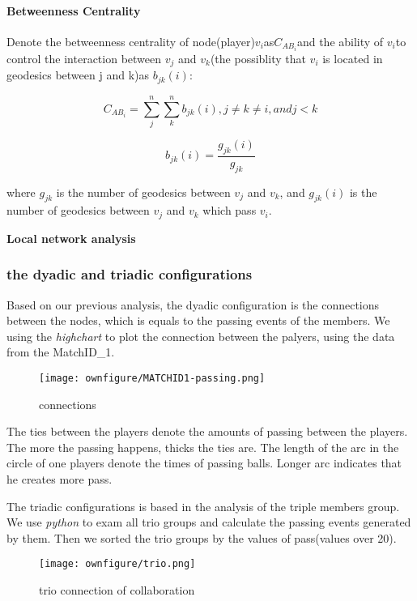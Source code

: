 \documentclass{mcmthesis}
\begin{document}
\paragraph*{\textbf{Betweenness Centrality}}

\noindent Denote the betweenness centrality of node(player)$v_{i}$as$C_{AB_{i}}$and
the ability of $v_{i}$to control the interaction between $v_{j}$ and
$v_{k}$(the possiblity that $v_{i}$ is located in geodesics between
j and k)as $b_{jk}(i)$:

\[
C_{AB_{i}}=\sum_{j}^{n}\sum_{k}^{n}b_{jk}(i),j\neq k\neq i,and j<k
\]

\[
b_{jk}(i)=\frac{g_{jk}(i)}{g_{jk}}
\]

where $g_{jk}$ is the number of geodesics between $v_{j}$ and $v_{k}$,
and $g_{jk}(i)$ is the number of geodesics between $v_{j}$ and $v_{k}$
which pass $v_{i}$.

\textbf{Local network analysis}
\subsubsection{the dyadic and triadic configurations}

Based on our previous analysis, the dyadic configuration is the connections
between the nodes, which is equals to the passing events of the members.
We using the \textit{highchart} to plot the connection between the palyers, using the data
from the MatchID_1.

\begin{figure}
  \centering
  \small
  \texttt{[image: ownfigure/MATCHID1-passing.png]}
  \caption{connections}
\end{figure}

The ties between the players denote the amounts of passing between the players.
The more the passing happens, thicks the ties are. The length of the arc in the circle
of one players denote the times of passing balls. Longer arc indicates that he creates
more pass. 

The triadic configurations is based in the analysis of the triple members group.
We use \textit{python} to exam all trio groups and calculate the passing events generated
by them. Then we sorted the trio groups by the values of pass(values over 20).

\begin{figure}
  \centering
  \small
  \texttt{[image: ownfigure/trio.png]}
  \caption{trio connection of collaboration}
\end{figure}
\end{document}
